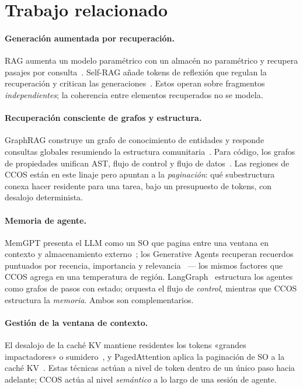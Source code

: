 \documentclass[11pt]{article}
\begin{document}
\section{Trabajo relacionado}\label{sec:related}

\paragraph{Generación aumentada por recuperación.} RAG aumenta un modelo paramétrico
con un almacén no paramétrico y recupera pasajes por consulta~\cite{lewis2020rag}.
Self-RAG añade tokens de reflexión que regulan la recuperación y critican las
generaciones~\cite{asai2023selfrag}. Estos operan sobre fragmentos
\emph{independientes}; la coherencia entre elementos recuperados no se modela.

\paragraph{Recuperación consciente de grafos y estructura.} GraphRAG construye un
grafo de conocimiento de entidades y responde consultas globales resumiendo la
estructura comunitaria~\cite{edge2024graphrag}. Para código, los grafos de propiedades
unifican AST, flujo de control y flujo de datos~\cite{yamaguchi2014cpg}. Las regiones
de CCOS están en este linaje pero apuntan a la \emph{paginación}: qué subestructura
conexa hacer residente para una tarea, bajo un presupuesto de tokens, con desalojo
determinista.

\paragraph{Memoria de agente.} MemGPT presenta el LLM como un SO que pagina entre una
ventana en contexto y almacenamiento externo~\cite{packer2023memgpt}; los Generative
Agents recuperan recuerdos puntuados por recencia, importancia y
relevancia~\cite{park2023generative} --- los mismos factores que CCOS agrega en una
temperatura de región. LangGraph~\cite{langgraph} estructura los agentes como grafos
de pasos con estado; orquesta el flujo de \emph{control}, mientras que CCOS estructura
la \emph{memoria}. Ambos son complementarios.

\paragraph{Gestión de la ventana de contexto.} El desalojo de la caché KV mantiene
residentes los tokens «grandes impactadores» o sumidero~\cite{liu2023lost}, y
PagedAttention aplica la paginación de SO a la caché KV~\cite{kwon2023paged}. Estas
técnicas actúan a nivel de token dentro de un único paso hacia adelante; CCOS actúa al
nivel \emph{semántico} a lo largo de una sesión de agente.
\end{document}
